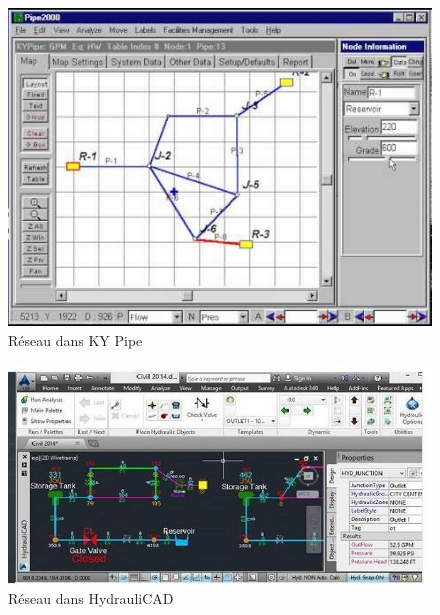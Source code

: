 \documentclass[a4paper, 11pt]{article}
\begin{document}
\begin{minipage}{\linewidth}
      \centering
      \begin{minipage}{0.45\linewidth}
          \begin{figure}[H]
              \includegraphics[width=\linewidth]{Etude_Comparative_1/kypipe}
              \caption{Réseau dans KY Pipe}
          \end{figure}
      \end{minipage}
      \hspace{0.05\linewidth}
      \begin{minipage}{0.45\linewidth}
          \begin{figure}[H]
              \includegraphics[width=\linewidth]{Etude_Comparative_1/hydraulicad}
              \caption{Réseau dans HydrauliCAD}
          \end{figure}
      \end{minipage}
  \end{minipage}
\end{document}
